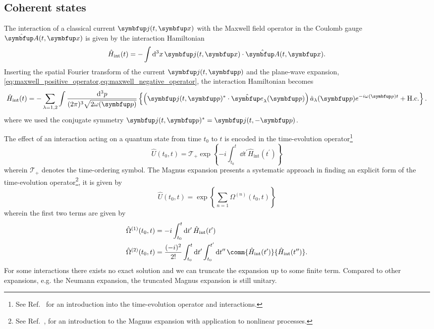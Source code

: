 \subsection{Coherent states}

The interaction of a classical current $\vb{j}(t,\vb{x})$ with the Maxwell field operator in the Coulomb gauge $\vu{A}(t,\vb{x})$ is given by the interaction Hamiltonian
\begin{equation}
	\hat{H}_\text{int}(t)
	=
	-
	\int\dd[3]{x}
	\vb{j}(t,\vb{x})
	\vdot
	\hat{\vb{A}}(t,\vb{x})
	.
\end{equation}
Inserting the spatial Fourier transform of the current $\vb{j}(t,\vb{p})$ and the plane-wave expansion, \cref{eq:maxwell_positive_operator,eq:maxwell_negative_operator}, the interaction Hamiltonian becomes
\begin{equation}
	\hat{H}_\text{int}(t)
	=
	-
	\sum_{\lambda=1,2}
	\int\frac{\dd[3]{p}}{(2\pi)^3\sqrt{2\omega(\vb{p})}}
	\left\{
		\left(
			\vb{j}(t,\vb{p})^*
			\vdot
			\vu{e}_\lambda(\vb{p})
		\right)
		\hat{a}_\lambda(\vb{p})
		e^{-i\omega(\vb{p})t}
		+
		\text{H.c.}
	\right\}
	\label{eq:classical_current_interaction}
	.
\end{equation}
where we used the conjugate symmetry $\vb{j}(t,\vb{p})^*=\vb{j}(t,-\vb{p})$.

The effect of an interaction acting on a quantum state from time $t_0$ to $t$ is encoded in the time-evolution operator\footnote{See Ref.~\cite[p.~215]{Greiner2013} for an introduction into the time-evolution operator and interactions.}
\begin{equation}
	\hat{U}(t_0,t)
	=
	\mathcal{T}_+
	\exp\left\{
		-i
		\int_{t_0}^t\dd{t^\prime}
		\hat{H}_\text{int}(t^\prime)
	\right\}
	\label{eq:time_evolution_operator}
\end{equation}
wherein $\mathcal{T}_+$ denotes the time-ordering symbol.
The Magnus expansion presents a systematic approach in finding an explicit form of the time-evolution operator\footnote{See Ref.~\cite[p.~42]{QuesadaMejia2015}, for an introduction to the Magnus expansion with application to nonlinear processes.}, it is given by
\begin{equation}
	\hat{U}(t_0,t)
	=
	\exp\left\{
		\sum_{n=1}
		\Omega^{(n)}(t_0,t)
	\right\}
\end{equation}
wherein the first two terms are given by
\begin{align}
	\hat{\Omega}^{(1)}(t_0,t)
	&=
	-i
	\int_{t_0}^t\dd{t^\prime}
	\hat{H}_\text{int}(t^\prime)
	\\
	\hat{\Omega}^{(2)}(t_0,t)
	&=
	\frac{(-i)^2}{2!}
	\int_{t_0}^t\dd{t^\prime}
	\int_{t_0}^{t^\prime}\dd{t^{\prime\prime}}
	\comm{\hat{H}_\text{int}(t^\prime)}{\hat{H}_\text{int}(t^{\prime\prime})}
	.
\end{align}
For some interactions there exists no exact solution and we can truncate the expansion up to some finite term.
Compared to other expansions, e.g. the Neumann expansion, the truncated Magnus expansion is still unitary.

